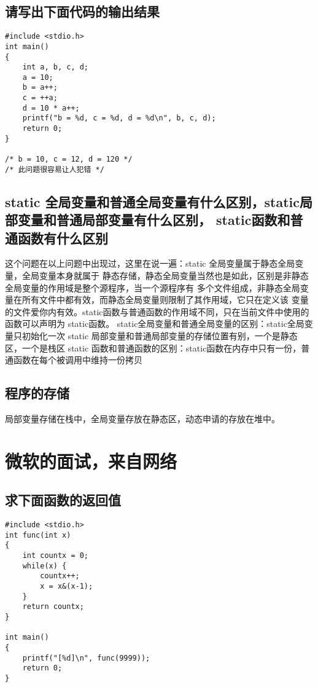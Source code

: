\documentclass{article}
\begin{document}
\subsection{请写出下面代码的输出结果}
\begin{verbatim}
#include <stdio.h>
int main()
{
	int a, b, c, d;
	a = 10;
	b = a++;
	c = ++a;
	d = 10 * a++;
	printf("b = %d, c = %d, d = %d\n", b, c, d);
	return 0;
}

/* b = 10, c = 12, d = 120 */
/* 此问题很容易让人犯错 */
\end{verbatim}

\subsection{static 全局变量和普通全局变量有什么区别，static局部变量和普通局部变量有什么区别，
static函数和普通函数有什么区别}
这个问题在以上问题中出现过，这里在说一遍：static 全局变量属于静态全局变量，全局变量本身就属于
静态存储，静态全局变量当然也是如此，区别是非静态全局变量的作用域是整个源程序，当一个源程序有
多个文件组成，非静态全局变量在所有文件中都有效，而静态全局变量则限制了其作用域，它只在定义该
变量的文件爱你内有效。static函数与普通函数的作用域不同，只在当前文件中使用的函数可以声明为
static函数。
\indent static全局变量和普通全局变量的区别：static全局变量只初始化一次
static 局部变量和普通局部变量的存储位置有别，一个是静态区，一个是栈区
static 函数和普通函数的区别：static函数在内存中只有一份，普通函数在每个被调用中维持一份拷贝

\subsection{程序的存储}
局部变量存储在栈中，全局变量存放在静态区，动态申请的存放在堆中。
\section{微软的面试，来自网络}
\subsection{求下面函数的返回值}
\begin{verbatim}
#include <stdio.h>
int func(int x)
{
	int countx = 0;
	while(x) {
		countx++;
		x = x&(x-1);
	}
	return countx;
}

int main()
{
	printf("[%d]\n", func(9999));
	return 0;
}

\end{verbatim}
\end{document}
